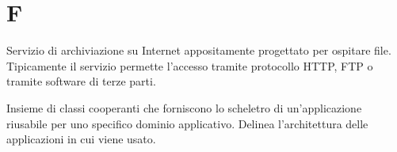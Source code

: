 \section{F}

Servizio di archiviazione su Internet appositamente progettato per ospitare file. Tipicamente il servizio permette l'accesso tramite protocollo HTTP, FTP o tramite software di terze parti.

Insieme di classi cooperanti che forniscono lo scheletro di un'applicazione riusabile per uno specifico dominio applicativo. Delinea l'architettura delle applicazioni in cui viene usato.
